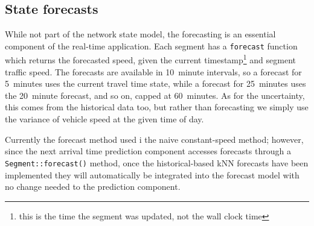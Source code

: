 \subsection{State forecasts}
\label{sec:nw_implementation_forecast}

While not part of the network state model, the forecasting is an essential component of the real-time application. Each segment has a \verb+forecast+ function which returns the forecasted speed, given the current timestamp\footnote{this is the time the segment was updated, not the wall clock time} and segment traffic speed. The forecasts are available in 10~minute intervals, so a forecast for 5~minutes uses the current travel time state, while a forecast for 25~minutes uses the 20~minute forecast, and so on, capped at 60~minutes. As for the uncertainty, this comes from the historical data too, but rather than forecasting we simply use the variance of vehicle speed at the given time of day.

Currently the forecast method used i the na\:ive constant-speed method; however, since the next arrival time prediction component accesses forecasts through a \verb+Segment::forecast()+ method, once the historical-based kNN forecasts have been implemented they will automatically be integrated into the forecast model with no change needed to the prediction component.
